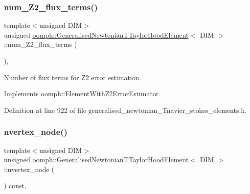 \mbox{\label{classoomph_1_1GeneralisedNewtonianTTaylorHoodElement_af391b30468903ccd73ab58cbb3fff7c1}} 
\subsubsection{\texorpdfstring{num\+\_\+\+Z2\+\_\+flux\+\_\+terms()}{num\_Z2\_flux\_terms()}}
{\footnotesize\ttfamily template$<$unsigned D\+IM$>$ \\
unsigned \hyperlink{classoomph_1_1GeneralisedNewtonianTTaylorHoodElement}{oomph\+::\+Generalised\+Newtonian\+T\+Taylor\+Hood\+Element}$<$ D\+IM $>$\+::num\+\_\+\+Z2\+\_\+flux\+\_\+terms (\begin{DoxyParamCaption}{ }\end{DoxyParamCaption})\hspace{0.3cm}{\ttfamily [inline]}, {\ttfamily [virtual]}}



Number of \textquotesingle{}flux\textquotesingle{} terms for Z2 error estimation. 



Implements \hyperlink{classoomph_1_1ElementWithZ2ErrorEstimator_ae82c5728902e13da31be19c390fc28e3}{oomph\+::\+Element\+With\+Z2\+Error\+Estimator}.



Definition at line 922 of file generalised\+\_\+newtonian\+\_\+\+Tnavier\+\_\+stokes\+\_\+elements.\+h.

\mbox{\label{classoomph_1_1GeneralisedNewtonianTTaylorHoodElement_aa01c42f2e33c0fe78dfedceadd7ae78e}} 
\subsubsection{\texorpdfstring{nvertex\+\_\+node()}{nvertex\_node()}}
{\footnotesize\ttfamily template$<$unsigned D\+IM$>$ \\
unsigned \hyperlink{classoomph_1_1GeneralisedNewtonianTTaylorHoodElement}{oomph\+::\+Generalised\+Newtonian\+T\+Taylor\+Hood\+Element}$<$ D\+IM $>$\+::nvertex\+\_\+node (\begin{DoxyParamCaption}{ }\end{DoxyParamCaption}) const\hspace{0.3cm}{\ttfamily [inline]}, {\ttfamily [virtual]}}



